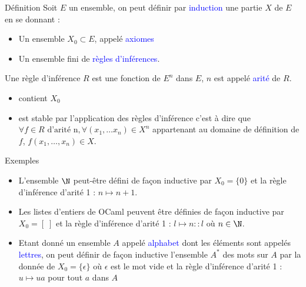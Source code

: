 \documentclass[10pt]{beamer}
\begin{document}
\begin{frame}[fragile]{\Ctitle}{\stitle}
	\begin{alertblock}{Définition}
        Soit $E$ un ensemble, on peut définir par \textcolor{blue}{induction} une partie $X$ de $E$ en se donnant :
        \begin{itemize}
            \item<2-> Un ensemble $X_0 \subset E$, appelé \textcolor{blue}{axiomes}
            \item<3-> Un ensemble fini de \textcolor{blue}{règles d'inférences}.
        \end{itemize}
        Une règle d'inférence $R$ est une fonction de $E^n$ dans $E$, $n$ est appelé \textcolor{blue}{arité} de $R$.\\
        
        \begin{itemize}
            \item<6-> contient $X_0$ 
            \item<7-> est stable par l'application des règles d'inférence c'est à dire que $\forall f \in R \text{ d'arité } $n$, \forall (x_1, \dots x_n) \in X^n$ appartenant au domaine de définition de $f$, $f(x_1,\dots,x_n) \in X$.
        \end{itemize}
    \end{alertblock}
\end{frame}

\begin{frame}[fragile]{\Ctitle}{\stitle}
    \begin{exampleblock}{Exemples}
        \begin{itemize}
            \item L'ensemble $\N$ peut-être défini de façon inductive par $X_0 = \{0\}$ et la règle d'inférence d'arité 1 : $n \mapsto n+1$.
            \item<2-> Les listes  d'entiers de OCaml peuvent être définies de façon inductive par $X_0 = [\;]$ et la règle d'inférence d'arité 1 : $ l \mapsto n::l$ où $n \in \N$. \\
            \item<4-> Etant donné un ensemble $A$ appelé \textcolor{blue}{alphabet} dont les éléments sont appelés \textcolor{blue}{lettres}, on peut définir de façon inductive l'ensemble $A^*$ des mots sur $A$ par la donnée de $X_0 = \{\epsilon\}$ où $\epsilon$ est le mot vide et la règle d'inférence d'arité 1 : $ u \mapsto ua$ pour tout $a$ dans $A$
        \end{itemize}
     \end{exampleblock}
\end{frame}
\end{document}
